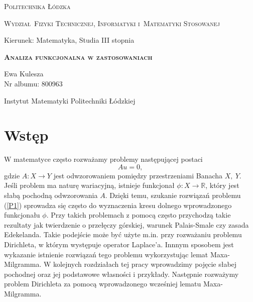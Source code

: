 \documentclass[12pt,a4paper,oneside,titlepage]{article}
\begin{document}
\begin{titlepage}
\begin{flushleft}
\end{flushleft}
\begin{center}
\textsc{{\huge Politechnika \L\'odzka}}
\end{center}
\bigskip
\bigskip
\begin{center}
\textsc{{\Large Wydzia\l\ Fizyki Technicznej, Informatyki i~Matematyki Stosowanej}}
\end{center}
\bigskip
\bigskip
\begin{Large}
Kierunek: Matematyka, 
Studia III stopnia %

\end{Large}
\bigskip
\bigskip
\bigskip
\noindent\hrulefill
\begin{center}
\textsc{\textbf{{\Large Analiza funkcjonalna w zastosowaniach %
\\}}}
\end{center}
\bigskip
\bigskip
\begin{flushright}
{\large 
Ewa Kulesza %
\\
Nr albumu: 
800963 %
\\}
\end{flushright}
\noindent\hrulefill
\bigskip
\bigskip
\bigskip
\bigskip
\begin{center}
{\large  %
 Instytut Matematyki Politechniki \L\'odzkiej\\ 

 }
\end{center}
\bigskip
\bigskip
\bigskip
\bigskip

\end{titlepage}




\section{Wstęp}

W matematyce często rozważamy problemy następującej postaci
\begin{equation}
\label{P1}
Au = 0,
\end{equation}
gdzie $A:X \rightarrow  Y$ jest odwzorowaniem pomiędzy przestrzeniami Banacha $X,~Y$. Jeśli problem ma naturę wariacyjną, istnieje funkcjonał $\phi : X \rightarrow \mathbb{R}$, który jest słabą pochodną odwzorowania $A$. Dzięki temu, szukanie rozwiązań problemu (\ref{P1}) sprowadza się często do wyznaczenia kresu dolnego wprowadzonego funkcjonału $\phi$. Przy takich problemach z pomocą często przychodzą takie rezultaty jak twierdzenie o przełęczy górskiej, warunek Palais-Smale czy zasada Edekelanda. Takie podejście może być użyte m.in. przy rozważaniu problemu Dirichleta, w którym występuje operator Laplace'a. Innnym sposobem jest wykazanie istnienie rozwiązań tego problemu wykorzystując lemat Maxa-Milgramma. W kolejnych rozdziałach tej pracy wprowadzimy pojęcie słabej pochodnej oraz jej podstawowe własności i przykłady. Następnie rozważymy problem Dirichleta za pomocą wprowadzonego wcześniej lematu Maxa-Milgramma.
\end{document}
